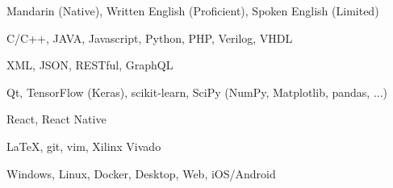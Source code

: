 
\begin{cvtbl}
        {Mandarin (Native), Written English (Proficient), Spoken English (Limited)}

        {C/C++, JAVA, Javascript, Python, PHP, Verilog, VHDL}

        {XML, JSON, RESTful, GraphQL}

        {Qt, TensorFlow (Keras), scikit-learn, SciPy (NumPy, Matplotlib, pandas, ...)}

        {React, React Native}

        {\LaTeX, git, vim, Xilinx Vivado}

        {Windows, Linux, Docker, Desktop, Web, iOS/Android}
\end{cvtbl}

\endinput